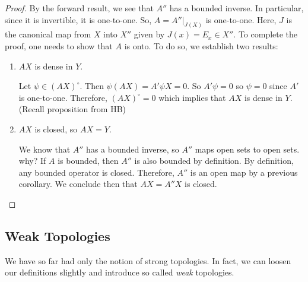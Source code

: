 \documentclass[letterpaper,twoside,11pt]{article}
\theoremstyle{mystyle}
\newcommand{\cg}{\color{gray}}
\newcommand{\cbk}{\color{black}}
\begin{document}
\begin{proof}
  By the forward result, we see that $A''$ has a bounded inverse. In particular, since it is invertible, it is one-to-one. So, $A = {\left. {A''} \right|_{J\left( X \right)}}$ is one-to-one. \cg Here, $J$ is the canonical map from $X$ into $X''$ given by $J(x) = E_x\in X''$. \cbk To complete the proof, one needs to show that $A$ is onto. To do so, we establish two results: 
  \begin{enumerate}
    \item $AX$ is dense in $Y$. 
    
      Let $\psi \in (AX)^\circ$. Then $\psi(AX) = A'\psi X = 0$. So $A'\psi = 0 $ so $\psi = 0$ since $A' $ is one-to-one. Therefore, $(AX)^\circ = 0$ which implies that $AX$ is dense in $Y$. (Recall proposition from HB)

    \item $AX$ is closed, so $AX = Y$. 
    
      We know that $A''$ has a bounded inverse, so $A''$ maps open sets to open sets. \cg why? If $A$ is bounded, then $A''$ is also bounded by definition. By definition, any bounded operator is closed. Therefore, $A''$ is an open map by a previous corollary. \cbk We conclude then that $AX = A''X$ is closed. 
  \end{enumerate}
\end{proof}













\newpage \subsection{Weak Topologies} We have so far had only the notion of strong topologies. In fact, we can loosen our definitions slightly and introduce so called \textit{weak} topologies. 
\end{document}
